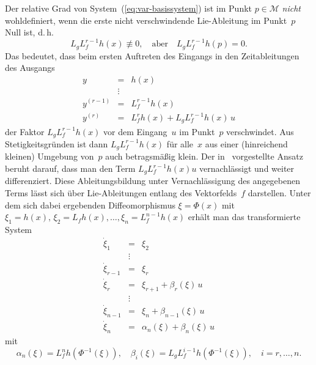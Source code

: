 Der relative Grad von System~(\ref{eq:var-basissystem}) ist im Punkt
$p\in\mathcal{M}$ \textit{nicht} wohldefiniert, wenn die erste nicht
verschwindende Lie-Ableitung im Punkt~$p$ Null ist, d.\,h. 
\[
L_{g}L_{f}^{r-1}h(x)\not\equiv0,\quad\text{aber}\quad L_{g}L_{f}^{r-1}h(p)=0.
\]
Das bedeutet, dass beim ersten Auftreten des Eingangs in den Zeitableitungen
des Ausgangs 
\[
\begin{array}{lcl}
y & = & h(x)\\
 & \vdots\\
y^{(r-1)} & = & L_{f}^{r-1}h(x)\\
y^{(r)} & = & L_{f}^{r}h(x)+L_{g}L_{f}^{r-1}h(x)\,u
\end{array}
\]
der Faktor $L_{g}L_{f}^{r-1}h(x)$ vor dem Eingang~$u$ im Punkt~$p$
verschwindet. Aus Stetigkeitsgründen ist dann $L_{g}L_{f}^{r-1}h(x)$
für alle~$x$ aus einer (hinreichend kleinen) Umgebung von~$p$
auch betragsmäßig klein. Der in~\cite{hauser92} vorgestellte Ansatz
beruht darauf, dass man den Term $L_{g}L_{f}^{r-1}h(x)u$ vernachlässigt
und weiter differenziert. Diese Ableitungsbildung unter Vernachlässigung
des angegebenen Terms lässt sich über Lie-Ableitungen entlang des
Vektorfelds~$f$ darstellen. Unter dem sich dabei ergebenden Diffeomorphismus
$\xi=\Phi(x)$ mit $\xi_{1}=h(x),\,\xi_{2}=L_{f}h(x),\ldots,\xi_{n}=L_{f}^{n-1}h(x)$
erhält man das transformierte System
\begin{equation}
\begin{array}{lcl}
\dot{\xi}_{1} & = & \xi_{2}\\
 & \vdots\\
\dot{\xi}_{r-1} & = & \xi_{r}\\
\dot{\xi}_{r} & = & \xi_{r+1}+\beta_{r}(\xi)\,u\\
 & \vdots\\
\dot{\xi}_{n-1} & = & \xi_{n}+\beta_{n-1}(\xi)\,u\\
\dot{\xi}_{n} & = & \alpha_{n}(\xi)+\beta_{n}(\xi)\,u
\end{array}\label{eq:var-approx-ARNF}
\end{equation}
mit 
\[
\alpha_{n}(\xi)=L_{f}^{n}h(\Phi^{-1}(\xi)),\quad\beta_{i}(\xi)=L_{g}L_{f}^{i-1}h(\Phi^{-1}(\xi)),\quad i=r,\ldots,n.
\]

